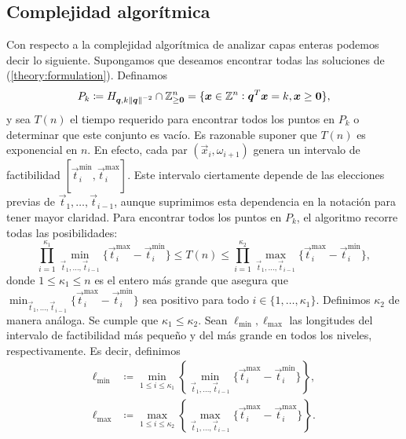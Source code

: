 \subsection{Complejidad algorítmica}
\noindent
Con respecto a la complejidad algorítmica de analizar capas enteras podemos decir lo siguiente.
Supongamos que deseamos encontrar todas las soluciones de (\ref{theory:formulation}). Definamos
\begin{equation}
	\label{phase-1:def:feasible-layer}
	P_k \coloneq H_{\boldsymbol{q}, k\left\lVert \boldsymbol{q} \right\rVert^{-2}} \cap \mathbb{Z}_{\geq \boldsymbol{0}}^n
	=
	\lbrace \boldsymbol{x} \in \mathbb{Z}^n \vcentcolon \boldsymbol{q}^T\boldsymbol{x} = k, \boldsymbol{x} \geq \boldsymbol{0}
	\rbrace,
\end{equation}
y sea $T(n)$ el tiempo requerido para encontrar todos los puntos en $P_k$ o determinar que este
conjunto es vacío. Es razonable suponer que $T(n)$ es exponencial en $n$. En efecto, cada par
$(\vec{x}_i, \omega_{i + 1})$ genera un intervalo de factibilidad $[\vec{t}_i^{\min},
\vec{t}_i^{\max}]$. Este intervalo ciertamente depende de las elecciones previas de $\vec{t}_1, \ldots,
\vec{t}_{i - 1}$, aunque suprimimos esta dependencia en la notación para tener mayor claridad. Para
encontrar todos los puntos en $P_k$, el algoritmo recorre todas las posibilidades:
\begin{equation}
	\label{phase-1:complexity:bounds}
	\prod_{i=1}^{\kappa_1} \min_{\vec{t}_1, \ldots, \vec{t}_{i-1}} \lbrace \vec{t}_i^{\max} -
	\vec{t}_i^{\min} \rbrace
	\leq T(n) \leq
	\prod_{i=1}^{\kappa_2} \max_{\vec{t}_1, \ldots, \vec{t}_{i-1}} \lbrace \vec{t}_i^{\max} -
	\vec{t}_i^{\min} \rbrace,
\end{equation}
donde $1 \leq \kappa_1 \leq n$ es el entero más grande que asegura que  $\min_{\vec{t}_1, \ldots,
\vec{t}_{i - 1}}\lbrace \vec{t}_i^{\max} - \vec{t}_i^{\min} \rbrace$ sea positivo para todo $i \in
\lbrace 1, \ldots, \kappa_1 \rbrace$. Definimos $\kappa_2$ de manera análoga. Se cumple que
$\kappa_1 \leq \kappa_2$. Sean $\ell_{\min}, \ell_{\max}$ las longitudes del intervalo de
factibilidad más pequeño y del más grande en todos los niveles, respectivamente. Es decir, definimos
\begin{align}
	\ell_{\min} &\coloneq \min_{1 \leq i \leq \kappa_1} \left\lbrace \min_{\vec{t}_1, \ldots,
	\vec{t}_{i - 1}} \lbrace \vec{t}_i^{\max} - \vec{t}_i^{\min} \rbrace \right\rbrace,
	\\
			\ell_{\max} &\coloneq \max_{1 \leq i \leq \kappa_2} \left\lbrace \max_{\vec{t}_1,
			\ldots, \vec{t}_{i - 1}} \lbrace \vec{t}_i^{\max} - \vec{t}_i^{\max} \rbrace
		\right\rbrace.
\end{align}
